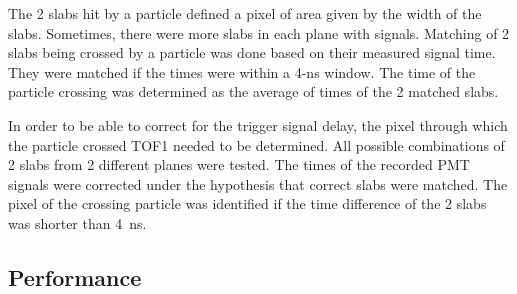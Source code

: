 The 2 slabs hit by a particle defined a pixel of area given by the
width of the slabs. Sometimes, there were more slabs in each plane
with signals. Matching of 2 slabs being crossed by a particle was done
based on their measured signal time. They were matched if the times
were within a 4-ns window. The time of the particle crossing was
determined as the average of times of the 2 matched slabs.


In order to be able to correct for the trigger signal delay, the pixel
through which the particle crossed TOF1 needed to be determined. All
possible combinations of 2 slabs from 2 different planes were
tested. The times of the recorded PMT signals were corrected under the
hypothesis that correct slabs were matched. The pixel of the crossing
particle was identified if the time difference of the 2 slabs was
shorter than 4~ns.


\subsection{Performance}
\label{SubSect:TOF_Performance}




